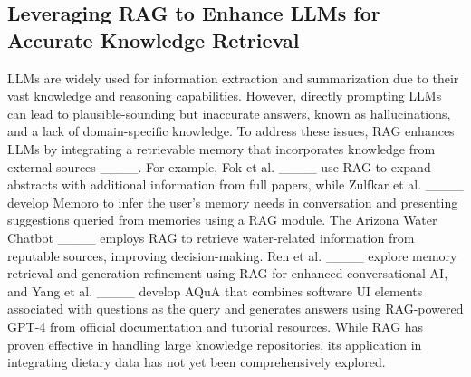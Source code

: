\subsection{Leveraging RAG to Enhance LLMs for Accurate Knowledge Retrieval}
LLMs are widely used for information extraction and summarization due to their vast knowledge and reasoning capabilities. However, directly prompting LLMs can lead to plausible-sounding but inaccurate answers, known as hallucinations, and a lack of domain-specific knowledge. To address these issues, RAG enhances LLMs by integrating a retrievable memory that incorporates knowledge from external sources ____. 
For example, Fok et al. ____ use RAG to expand abstracts with additional information from full papers, while Zulfkar et al. ____ develop Memoro to infer the user's memory needs in conversation and presenting suggestions queried from memories using a RAG module. 
The Arizona Water Chatbot ____ employs RAG to retrieve water-related information from reputable sources, improving decision-making.
Ren et al. ____ explore memory retrieval and generation refinement using RAG for enhanced conversational AI, and Yang et al. ____ develop AQuA that combines software UI elements associated with questions as the query and generates answers using RAG-powered GPT-4 from official documentation and tutorial resources.
While RAG has proven effective in handling large knowledge repositories, its application in integrating dietary data has not yet been comprehensively explored.